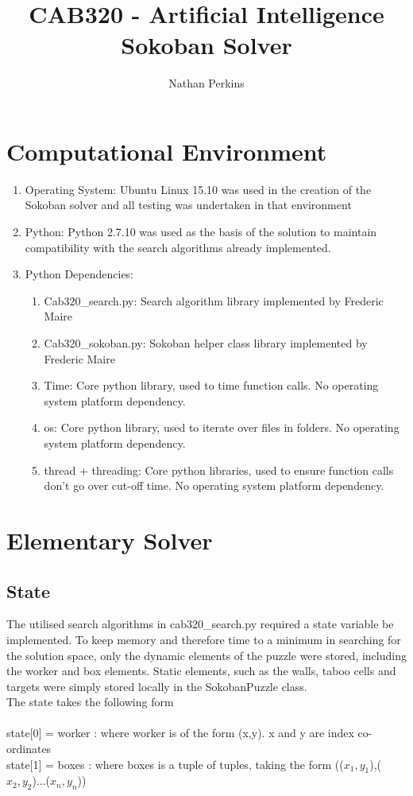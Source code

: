 \documentclass[]{article}
\title{CAB320 - Artificial Intelligence\\
	Sokoban Solver}
\author{Nathan Perkins}
\begin{document}
\maketitle
\newpage
\section{Computational Environment}
\begin{enumerate}
	\item Operating System: Ubuntu Linux 15.10 was used in the creation of the Sokoban solver and all testing was undertaken in that environment
	\item Python: Python 2.7.10 was used as the basis of the solution to maintain compatibility with the search algorithms already implemented.
	\item Python Dependencies: 
	\begin{enumerate}
		\item Cab320\_search.py: Search algorithm library implemented by Frederic Maire
		\item Cab320\_sokoban.py: Sokoban helper class library implemented by Frederic Maire
		\item Time: Core python library, used to time function calls. No operating system platform dependency.
		\item os: Core python library, used to iterate over files in folders. No operating system platform dependency.
		\item thread + threading: Core python libraries, used to ensure function calls don't go over cut-off time. No operating system platform dependency.
	\end{enumerate}
\end{enumerate}
\section{Elementary Solver}
\subsection{State}
The utilised search algorithms in cab320\_search.py required a state variable be implemented. To keep memory and therefore time to a minimum in searching for the solution space, only the dynamic elements of the puzzle were stored, including the worker and box elements. Static elements, such as the walls, taboo cells and targets were simply stored locally in the SokobanPuzzle class.\\
The state takes the following form\\
\\state[0] = worker : where worker is of the form (x,y). x and y are index co-ordinates
\\state[1] = boxes : where boxes is a tuple of tuples, taking the form (($x_1,y_1$),($x_2,y_2$)...($x_n,y_n$))
 
\end{document}
